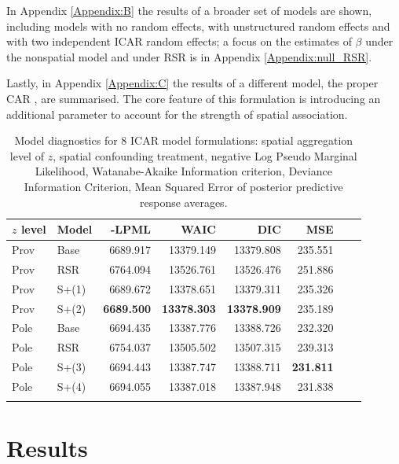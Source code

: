 \documentclass{book}
\begin{document}
In Appendix \ref{Appendix:B} the results of a broader set of models are shown, including models with no random effects, with unstructured random effects and with two independent ICAR random effects; a focus on the estimates of $\beta$ under the nonspatial model and under RSR is in Appendix \ref{Appendix:null_RSR}. 

Lastly, in Appendix \ref{Appendix:C} the results of a different model, the proper CAR \citep{PCAR_Gelfand}, are summarised. The core feature of this formulation is introducing an additional parameter to account for the strength of spatial association.


\begin{table}[ht]
\centering
\begin{tabular}{llrrrrrr}
  \toprule
  $z$ level & Model & -LPML & WAIC & DIC & MSE \\ 
  \midrule
  Prov & Base &6689.917 & 13379.149 & 13379.808 & 235.551 \\ %
  Prov & RSR  &6764.094 & 13526.761 & 13526.476 & 251.886 \\ %
  Prov & S+(1)&6689.672 & 13378.651 & 13379.311 & 235.326 \\ %
  Prov & S+(2)&\textbf{6689.500} & \textbf{13378.303} & \textbf{13378.909} & 235.189 \\  \midrule %
  Pole & Base &6694.435 & 13387.776 & 13388.726 & 232.320 \\ %
  Pole & RSR  &6754.037 & 13505.502 & 13507.315 & 239.313 \\ %
  Pole & S+(3)&6694.443 & 13387.747 & 13388.711 & \textbf{231.811} \\ %
  Pole & S+(4)&6694.055 & 13387.018 & 13387.948 & 231.838 \\ %
   \botrule 
   
\end{tabular}
\caption{Model diagnostics for 8 ICAR model formulations: spatial aggregation level of $z$, spatial confounding treatment, negative Log Pseudo Marginal Likelihood, Watanabe-Akaike Information criterion, Deviance Information Criterion, Mean Squared Error of posterior predictive response averages.}
\label{tab:ICAR_diagnostics}
\end{table}
\section{Results}\label{Par:results} \label{section:results}
\end{document}
